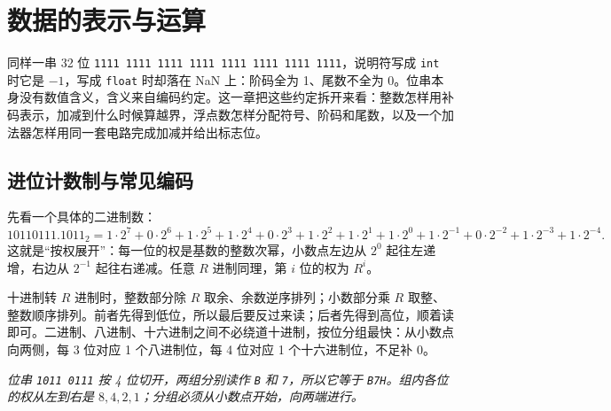 \section{数据的表示与运算}

同样一串 32 位 \texttt{1111 1111 1111 1111 1111 1111 1111 1111}，说明符写成 \texttt{int} 时它是 $-1$，写成 \texttt{float} 时却落在 NaN 上：阶码全为 1、尾数不全为 0。位串本身没有数值含义，含义来自编码约定。这一章把这些约定拆开来看：整数怎样用补码表示，加减到什么时候算越界，浮点数怎样分配符号、阶码和尾数，以及一个加法器怎样用同一套电路完成加减并给出标志位。

\subsection{进位计数制与常见编码}

先看一个具体的二进制数：
\[
10110111.1011_2
=1\cdot2^7+0\cdot2^6+1\cdot2^5+1\cdot2^4+0\cdot2^3+1\cdot2^2+1\cdot2^1+1\cdot2^0
+1\cdot2^{-1}+0\cdot2^{-2}+1\cdot2^{-3}+1\cdot2^{-4}.
\]
这就是“按权展开”：每一位的权是基数的整数次幂，小数点左边从 $2^0$ 起往左递增，右边从 $2^{-1}$ 起往右递减。任意 $R$ 进制同理，第 $i$ 位的权为 $R^i$。

十进制转 $R$ 进制时，整数部分除 $R$ 取余、余数逆序排列；小数部分乘 $R$ 取整、整数顺序排列。前者先得到低位，所以最后要反过来读；后者先得到高位，顺着读即可。二进制、八进制、十六进制之间不必绕道十进制，按位分组最快：从小数点向两侧，每 3 位对应 1 个八进制位，每 4 位对应 1 个十六进制位，不足补 0。

\begin{center}
\par\vspace{2pt}
{\footnotesize\itshape 位串 \texttt{1011 0111} 按 4 位切开，两组分别读作 \texttt{B} 和 \texttt{7}，所以它等于 \texttt{B7H}。组内各位的权从左到右是 $8,4,2,1$；分组必须从小数点开始，向两端进行。}
\end{center}

